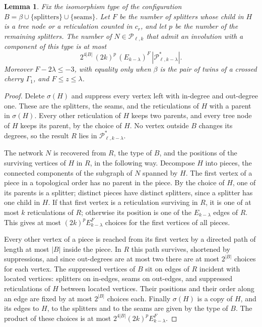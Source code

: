 \documentclass[11pt,a4paper]{article}
\newtheorem{lemma}[theorem]{Lemma}
\theoremstyle{definition}
\newcommand{\cP}{\mathcal{P}}
\begin{document}
\begin{lemma}\label{lem:blockcount}
Fix the isomorphism type of the configuration $B=\beta\cup\{\text{splitters}\}\cup\{\text{seams}\}$. Let $F$ be the number of splitters whose child in $H$ is a tree node or a reticulation counted in $c_r$, and let $p$ be the number of the remaining splitters. The number of $N\in\cP_{\ell,k}$ that admit an involution with a component of this type is at most
\[
2^{4|B|}\,(2k)^{p}\,(E_{k-\lambda})^{F}\,|\cP^*_{\ell,k-\lambda}|.
\]
Moreover $F-2\lambda\le-3$, with equality only when $\beta$ is the pair of twins of a crossed cherry $\Gamma_1$, and $F\le z\le\lambda$.
\end{lemma}

\begin{proof}
Delete $\sigma(H)$ and suppress every vertex left with in-degree and out-degree one. These are the splitters, the seams, and the reticulations of $H$ with a parent in $\sigma(H)$. Every other reticulation of $H$ keeps two parents, and every tree node of $H$ keeps its parent, by the choice of $H$. No vertex outside $B$ changes its degrees, so the result $R$ lies in $\cP^*_{\ell,k-\lambda}$.

The network $N$ is recovered from $R$, the type of $B$, and the positions of the surviving vertices of $H$ in $R$, in the following way. Decompose $H$ into pieces, the connected components of the subgraph of $N$ spanned by $H$. The first vertex of a piece in a topological order has no parent in the piece. By the choice of $H$, one of its parents is a splitter; distinct pieces have distinct splitters, since a splitter has one child in $H$. If that first vertex is a reticulation surviving in $R$, it is one of at most $k$ reticulations of $R$; otherwise its position is one of the $E_{k-\lambda}$ edges of $R$. This gives at most $(2k)^{p}E_{k-\lambda}^{F}$ choices for the first vertices of all pieces.

Every other vertex of a piece is reached from its first vertex by a directed path of length at most $|B|$ inside the piece. In $R$ this path survives, shortened by suppressions, and since out-degrees are at most two there are at most $2^{|B|}$ choices for each vertex. The suppressed vertices of $B$ sit on edges of $R$ incident with located vertices: splitters on in-edges, seams on out-edges, and suppressed reticulations of $H$ between located vertices. Their positions and their order along an edge are fixed by at most $2^{|B|}$ choices each. Finally $\sigma(H)$ is a copy of $H$, and its edges to $H$, to the splitters and to the seams are given by the type of $B$. The product of these choices is at most $2^{4|B|}(2k)^pE_{k-\lambda}^F$.


\end{proof}
\end{document}
